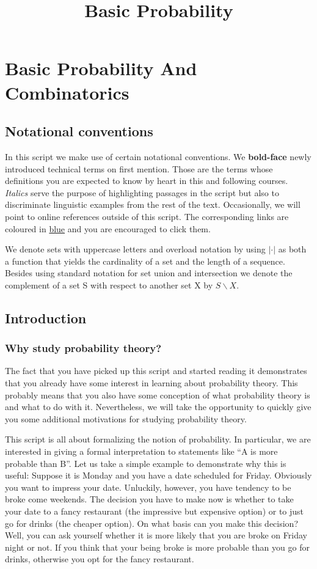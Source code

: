 \documentclass[a4paper,11pt,leqno]{report}
\title{Basic Probability}
\date{}
\begin{document}
\chapter{Basic Probability And Combinatorics}

\section*{Notational conventions}
In this script we make use of certain notational conventions. We \textbf{bold-face} newly introduced
technical terms on first mention. Those are the terms whose definitions you are expected to know by heart
in this and following courses. \textit{Italics} serve the purpose of highlighting passages in the
script but also to discriminate linguistic examples from the rest of the text. Occasionally, we will
point to online references outside of this script. The corresponding links are coloured in  
\href{http://en.wikibooks.org/wiki/LaTeX/Hyperlinks}{blue} and you are encouraged to click them.

We denote sets with uppercase letters and overload notation by using $ |\cdot| $ as both a function
that yields the cardinality of a set and the length of a sequence. Besides using standard notation
for set union and intersection we denote the complement of a set S with respect to another set X by
$ S\backslash X $.

\section{Introduction}
\subsection{Why study probability theory?}
The fact that you have picked up this script and started reading it demonstrates that you already have
some interest in learning about probability theory. This probably means that you also have some conception
of what probability theory is and what to do with it. Nevertheless, we will take the opportunity to
quickly give you some additional motivations for studying probability theory.

This script is all about formalizing the notion of probability. In particular, we are interested in 
giving a formal interpretation to statements like ``A is more probable than B''. Let us take a simple
example to demonstrate why this is useful: Suppose it is Monday and you have a date scheduled for
Friday. Obviously you want to impress your date. Unluckily, however, you have tendency to be broke
come weekends. The decision you have to make now is whether to take your date to a fancy restaurant
(the impressive but expensive option) or to just go for drinks (the cheaper option). On what basis can
you make this decision? Well, you can ask yourself whether it is more likely that you are broke on 
Friday night or not. If you think that your being broke is more probable than you go for drinks, otherwise
you opt for the fancy restaurant.
\end{document}
